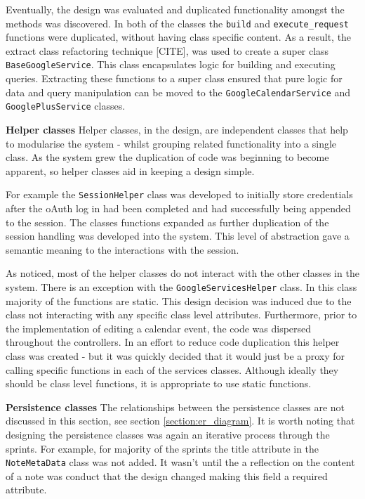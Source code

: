 Eventually, the design was evaluated and duplicated functionality amongst the methods was discovered. In both of the classes the \texttt{build} and \texttt{execute\_request} functions were duplicated, without having class specific content. As a result, the extract class refactoring technique [CITE], was used to create a super class \texttt{BaseGoogleService}. This class encapsulates logic for building  and executing queries. Extracting these functions to a super class ensured that pure logic for data and query manipulation can be moved to the \texttt{GoogleCalendarService} and \texttt{GooglePlusService} classes.


\noindent
\textbf{Helper classes}
\newline
Helper classes, in the design, are independent classes that help to modularise the system - whilst grouping related functionality into a single class. As the system grew the duplication of code was beginning to become apparent, so helper classes aid in keeping a design simple.

For example the \texttt{SessionHelper} class was developed to initially store credentials after the oAuth log in had been completed and had successfully being appended to the session. The classes functions expanded as further duplication of the session handling was developed into the system.  This level of abstraction gave a semantic meaning to the interactions with the session.

As noticed, most of the helper classes do not interact with the other classes in the system. There is an exception with the \texttt{GoogleServicesHelper} class. In this class majority of the functions are static. This design decision was induced due to the class not interacting with any specific class level attributes. Furthermore, prior to the implementation of editing a calendar event, the code was dispersed throughout the controllers. In an effort to reduce code duplication this helper class was created - but it was quickly decided that it would just be a proxy for calling specific functions in each of the services classes. Although ideally they should be class level functions, it is appropriate to use static functions.

\noindent
\textbf{Persistence classes}
\newline
The relationships between the persistence classes are not discussed in this section, see section \ref{section:er_diagram}. It is worth noting that designing the persistence classes was again an iterative process through the sprints. For example, for majority of the sprints the title attribute in the \texttt{NoteMetaData} class was not added. It wasn't until the a reflection on the content of a note was conduct that the design changed making this field a required attribute.

